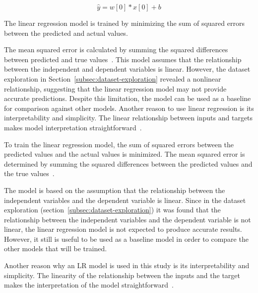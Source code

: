 \begin{tcolorbox}[arc=0pt,boxrule=0.5pt]
    \begin{equation}
        \hat{y} = w[0] * x[0] + b
        \label{eq:linear-regression-one-feature}
    \end{equation}
\end{tcolorbox}

The linear regression model is trained by minimizing the sum of squared errors between the predicted and actual
values.

The mean squared error is calculated by summing the squared differences between predicted and true
values~\cite[p. 47--68]{muller_introductionmachinelearning_2016}.
This model assumes that the relationship between the independent and dependent variables is linear.
However, the dataset exploration in Section~\ref{subsec:dataset-exploration} revealed
a nonlinear relationship, suggesting that the linear regression model may not provide accurate predictions.
Despite this limitation, the model can be used as a baseline for comparison against other models.
Another reason to use linear regression is its interpretability and simplicity.
The linear relationship between inputs and targets makes model interpretation
straightforward~\cite[p. 37]{molnar2020interpretable}.

To train the linear regression model, the sum of squared errors between the predicted values and
the actual values is minimized.
The mean squared error is determined by summing the squared differences between the predicted
values and the true values~\cite[p. 47--68]{muller_introductionmachinelearning_2016}.

The model is based on the assumption that the relationship between the independent
variables and the dependent variable is linear.
Since in the dataset exploration (section~\ref{subsec:dataset-exploration}) it was found that the relationship
between the independent variables and the dependent variable is not linear, the linear regression model
is not expected to produce accurate results.
However, it still is useful to be used as a baseline model in order to compare the other models that will be trained.

Another reason why an \ac{LR} model is used in this study is its interpretability and simplicity.
The linearity of the relationship between the inputs and the target makes the
interpretation of the model straightforward~\cite[p. 37]{molnar2020interpretable}.

